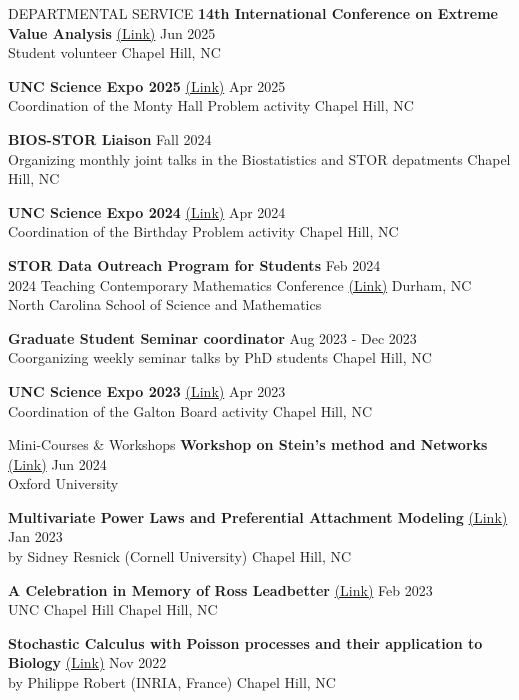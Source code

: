 \documentclass{resume} %
\begin{document}
\begin{rSection}{DEPARTMENTAL SERVICE}
    {\bf 14th International Conference on Extreme Value Analysis} \href{https://eva2025.unc.edu/}{(Link)} \hfill Jun 2025 \\
    Student volunteer \hfill Chapel Hill, NC

    {\bf UNC Science Expo 2025} \href{https://moreheadplanetarium.org/program/expo/}{(Link)} \hfill Apr 2025 \\
    Coordination of the Monty Hall Problem activity \hfill Chapel Hill, NC

    \textbf{BIOS-STOR Liaison} \hfill Fall 2024 \\ 
    Organizing monthly joint talks in the Biostatistics and STOR depatments \hfill Chapel Hill, NC

    {\bf UNC Science Expo 2024} \href{https://heellife.unc.edu/event/9215396}{(Link)} \hfill Apr 2024 \\
    Coordination of the Birthday Problem activity \hfill Chapel Hill, NC

    \textbf{STOR Data Outreach Program for Students} \hfill Feb 2024 \\
 2024 Teaching Contemporary Mathematics Conference \href{https://tcm.ncssm.edu/tcm-2024-sessions-and-speakers}{(Link)} \hfill Durham, NC \\
 North Carolina School of Science and Mathematics

    \textbf{Graduate Student Seminar coordinator} \hfill Aug 2023 - Dec 2023 \\
    Coorganizing weekly seminar talks by PhD students \hfill Chapel Hill, NC

    {\bf UNC Science Expo 2023} \href{https://stor.unc.edu/news-item/unc-science-expo-2023/}{(Link)} \hfill Apr 2023 \\
    Coordination of the Galton Board activity \hfill Chapel Hill, NC
\end{rSection}



\begin{rSection}{Mini-Courses \& Workshops}
    {\bf Workshop on Stein's method and Networks} \href{https://sites.google.com/view/workshop-stein-networks/program}{(Link)} \hfill Jun 2024 \\
    Oxford University

    {\bf Multivariate Power Laws and Preferential Attachment Modeling} \href{https://stor.unc.edu/news-item/rtg-lectures-by-resnick/}{(Link)} \hfill Jan 2023 \\
    by Sidney Resnick (Cornell University)  \hfill Chapel Hill, NC

    {\bf A Celebration in Memory of Ross Leadbetter} \href{https://stor.unc.edu/events/leadbetter-celebration/}{(Link)} \hfill Feb 2023 \\
    UNC Chapel Hill \hfill Chapel Hill, NC

    {\bf Stochastic Calculus with Poisson processes and their application to Biology} \href{https://stor.unc.edu/news-item/mini-course-by-philippe-robert/}{(Link)} \hfill Nov 2022 \\
    by Philippe Robert (INRIA, France) \hfill Chapel Hill, NC
\end{rSection}
\end{document}
